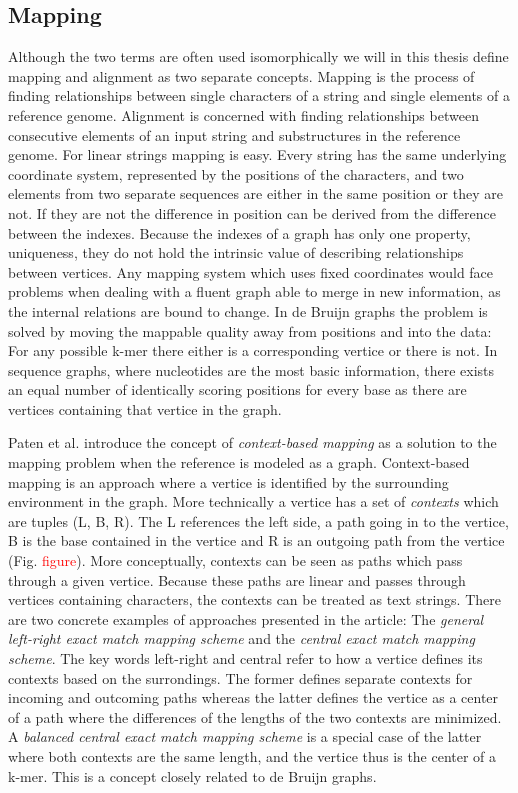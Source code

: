 \documentclass[thesis.tex]{subfiles}
\begin{document}
\subsection{Mapping}
Although the two terms are often used isomorphically we will in this thesis define mapping and alignment as two separate concepts. Mapping is the process of finding relationships between single characters of a string and single elements of a reference genome. Alignment is concerned with finding relationships between consecutive elements of an input string and substructures in the reference genome. For linear strings mapping is easy. Every string has the same underlying coordinate system, represented by the positions of the characters, and two elements from two separate sequences are either in the same position or they are not. If they are not the difference in position can be derived from the difference between the indexes. Because the indexes of a graph has only one property, uniqueness, they do not hold the intrinsic value of describing relationships between vertices. Any mapping system which uses fixed coordinates would face problems when dealing with a fluent graph able to merge in new information, as the internal relations are bound to change. In de Bruijn graphs the problem is solved by moving the mappable quality away from positions and into the data: For any possible k-mer there either is a corresponding vertice or there is not. In sequence graphs, where nucleotides are the most basic information, there exists an equal number of identically scoring positions for every base as there are vertices containing that vertice in the graph.\\
\par\noindent
Paten et al.\cite{mapping_to_a_reference_genome_structure} introduce the concept of \textit{context-based mapping} as a solution to the mapping problem when the reference is modeled as a graph. Context-based mapping is an approach where a vertice is identified by the surrounding environment in the graph. More technically a vertice has a set of \textit{contexts} which are tuples (L, B, R). The L references the left side, a path going in to the vertice, B is the base contained in the vertice and R is an outgoing path from the vertice (Fig. \textcolor{red}{figure}). More conceptually, contexts can be seen as paths which pass through a given vertice. Because these paths are linear and passes through vertices containing characters, the contexts can be treated as text strings. There are two concrete examples of approaches presented in the article: The \textit{general left-right exact match mapping scheme} and the \textit{central exact match mapping scheme}. The key words left-right and central refer to how a vertice defines its contexts based on the surrondings. The former defines separate contexts for incoming and outcoming paths whereas the latter defines the vertice as a center of a path where the differences of the lengths of the two contexts are minimized. A  \textit{balanced central exact match mapping scheme} is a special case of the latter where both contexts are the same length, and the vertice thus is the center of a k-mer. This is a concept closely related to de Bruijn graphs.\\
\end{document}
